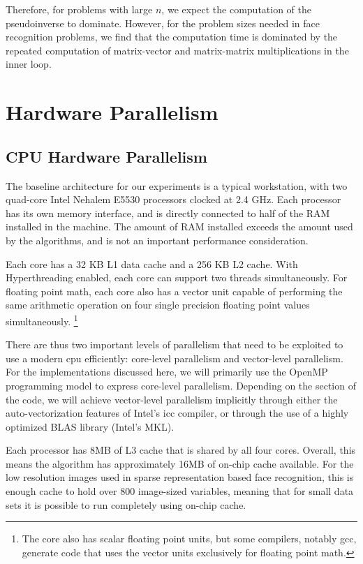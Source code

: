 \documentclass[10pt,twocolumn,letterpaper]{article}
\begin{document}
Therefore, for problems with large $n$, we expect the computation of the
pseudoinverse to dominate.  However, for the problem sizes needed in face
recognition problems, we find that the computation time is dominated by the
repeated computation of matrix-vector and matrix-matrix multiplications in the
inner loop.

\section{Hardware Parallelism} 

\subsection{CPU Hardware Parallelism} 
The baseline architecture for our experiments is a typical workstation,
with two quad-core Intel Nehalem E5530 processors clocked at 2.4 GHz.  Each
processor has its own memory interface, and is directly connected to half of
the RAM installed in the machine.  The amount of RAM installed exceeds the
amount used by the algorithms, and is not an important performance
consideration.  

Each core has a 32 KB L1 data cache and a 256 KB L2 cache. With Hyperthreading
enabled, each core can support two threads simultaneously.  For floating point
math, each core also has a vector unit capable of performing the same
arithmetic operation on four single precision floating point values
simultaneously.  \footnote{The core also has scalar floating point units, but
some compilers, notably gcc, generate code that uses the vector units
exclusively for floating point math.} 

There are thus two important levels of parallelism that need to be exploited to
use a modern cpu efficiently: core-level parallelism and vector-level
parallelism.  For the implementations discussed here, we will primarily use the
OpenMP programming model to express core-level parallelism.  Depending on the
section of the code, we will achieve vector-level parallelism implicitly
through either the auto-vectorization features of Intel's icc compiler, or
through the use of a highly optimized BLAS library (Intel's MKL).

Each processor has 8MB of L3 cache that is shared by all four cores.  Overall,
this means the algorithm has approximately 16MB of on-chip cache available.
For the low resolution images used in sparse representation based face
recognition, this is enough cache to hold over 800 image-sized variables,
meaning that for small data sets it is possible to run completely using on-chip
cache.
\end{document}
